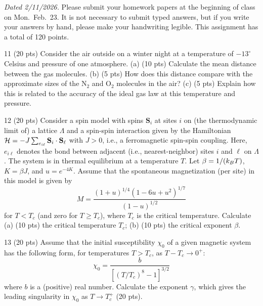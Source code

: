 
\noindent\emph{Dated 2/11/2026.} Please submit your homework papers at the beginning of class on Mon.\ Feb.\ 23. It is
not necessary to submit typed answers, but if you write your answers by hand, please make your handwriting legible.
This assignment has a total of 120 points.

\begin{hwproblem}{1}{1}
(20 pts) Consider the air outside on a winter night at a temperature of $-13^\circ$ Celsius and pressure of one
atmosphere. (a) (10 pts) Calculate the mean distance between the gas molecules. (b) (5 pts) How does this distance
compare with the approximate sizes of the N$_2$ and O$_2$ molecules in the air? (c) (5 pts) Explain how this is
related to the accuracy of the ideal gas law at this temperature and pressure.
\end{hwproblem}

\begin{hwproblem}{1}{2}
(20 pts) Consider a spin model with spins $\mathbf S_i$ at sites $i$ on (the thermodynamic limit of) a lattice
$\Lambda$ and a spin-spin interaction given by the Hamiltonian $\mathcal{H} = -J\sum_{e_{i\ell}}\mathbf S_i\cdot\mathbf S_\ell$
with $J>0$, i.e., a ferromagnetic spin-spin coupling. Here, $e_{i\ell}$ denotes the bond between adjacent (i.e.,
nearest-neighbor) sites $i$ and $\ell$ on $\Lambda$. The system is in thermal equilibrium at a temperature $T$. Let
$\beta = 1/(k_{B} T)$, $K = \beta J$, and $u = e^{-4K}$. Assume that the spontaneous magnetization (per site) in this model
is given by
\begin{equation}
  M = \frac{(1+u)^{1/4}(1-6u+u^2)^{1/7}}{(1-u)^{1/2}}
\end{equation}
for $T<T_c$ (and zero for $T\ge T_c$), where $T_c$ is the critical temperature. Calculate (a) (10 pts) the critical
temperature $T_c$; (b) (10 pts) the critical exponent $\beta$.
\end{hwproblem}

\begin{hwproblem}{1}{3}
(20 pts) Assume that the initial susceptibility $\chi_0$ of a given magnetic system has the following form, for
temperatures $T>T_c$, as $T-T_c\to 0^+$:
\begin{equation}
  \chi_0 = \frac{b}{\left[(T/T_c)^8-1\right]^{3/2}}
\end{equation}
where $b$ is a (positive) real number. Calculate the exponent $\gamma$, which gives the leading singularity in
$\chi_0$ as $T\to T_c^+$ (20 pts).
\end{hwproblem}

